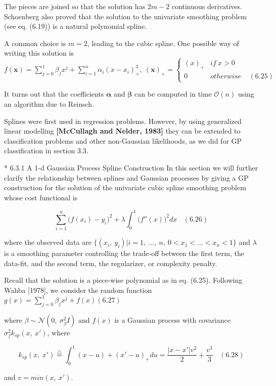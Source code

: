 \documentclass[
  ignorenonframetext,
]{beamer}
\begin{document}
\begin{frame}{}
\protect\hypertarget{section-21}{}
The pieces are joined so that the solution has \(2m − 2\) continuous
derivatives. Schoenberg also proved that the solution to the univariate
smoothing problem (see eq. (6.19)) is a natural polynomial spline.

A common choice is \(m = 2\), leading to the cubic spline. One possible
way of writing this solution is
\(f(\pmb x) = \sum^1_{j=0} \beta_j x^j + \sum^n_{i=1} \alpha_i(x − x_i)^3_+,\ (\pmb x)_+ = \begin{cases} (x)_+ & if\ x > 0\\ 0 & otherwise \ \ \ \ \ (6.25) \end{cases}\)

It turns out that the coefficients \(\pmb \alpha\) and \(\pmb \beta\)
can be computed in time \(\mathcal O(n)\) using an algorithm due to
Reinsch.

Splines were first used in regression problems. However, by using
generalized linear modelling \textbf{{[}McCullagh and Nelder, 1983{]}}
they can be extended to classification problems and other non-Gaussian
likelihoods, as we did for GP classification in section 3.3.
\end{frame}

\begin{frame}{* 6.3.1 A 1-d Gaussian Process Spline Construction}
\protect\hypertarget{a-1-d-gaussian-process-spline-construction}{}
In this section we will further clarify the relationship between splines
and Gaussian processes by giving a GP construction for the solution of
the univariate cubic spline smoothing problem whose cost functional is

\[
\sum^n_{i=1} \big(f(x_i) − y_i\big)^2 + \lambda  \int_0^1 \big(f''(x)\big)^2 dx \ \ \ \ (6.26)
\]

where the observed data are
\(\{(x_i,\ y_i)|i = 1,\ ... ,\ n,\ 0 < x_1 < ... < x_n < 1\}\) and
\(\lambda\) is a smoothing parameter controlling the trade-off between
the first term, the data-fit, and the second term, the regularizer, or
complexity penalty.

Recall that the solution is a piece-wise polynomial as in eq. (6.25).
Following Wahba {[}1978{]}, we consider the random function
\(g(x) = \sum^1_{j=0} \beta_j x^j + f(x) (6.27)\)

where \(\beta \sim \mathcal N(0,\ \sigma_\beta^2 I)\) and \(f(x)\) is a
Gaussian process with covariance \(\sigma_f^2 k_{sp} (x,\ x')\), where

\[
k_{sp}(x,\ x') \stackrel \bigtriangleup = \int_0^1(x − u)+(x' − u)_+ du = \frac {|x − x'|v^2} {2} + \frac {v^3} 3 \ \ \ \ (6.28)
\]

and \(v = min(x,\ x')\).
\end{frame}
\end{document}
